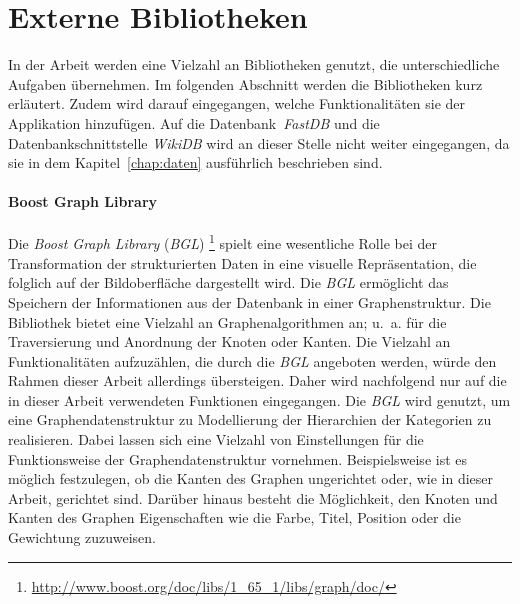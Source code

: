 


\section{Externe Bibliotheken}\label{subchap:external-libs}

In der Arbeit werden eine Vielzahl an Bibliotheken genutzt, die unterschiedliche Aufgaben übernehmen.
Im folgenden Abschnitt werden die Bibliotheken kurz erläutert.
Zudem wird darauf eingegangen, welche Funktionalitäten sie der Applikation hinzufügen.
Auf die Datenbank~\emph{FastDB} und die Datenbankschnittstelle \emph{WikiDB} wird an dieser Stelle nicht weiter eingegangen, da sie in dem Kapitel~\ref{chap:daten} ausführlich beschrieben sind.

\paragraph{Boost Graph Library}
Die \emph{Boost Graph Library} (\emph{BGL}) \footnote{\url{http://www.boost.org/doc/libs/1_65_1/libs/graph/doc/}} spielt eine wesentliche Rolle bei der Transformation der strukturierten Daten in eine visuelle Repräsentation, die folglich auf der Bildoberfläche dargestellt wird.
Die \emph{BGL} ermöglicht das Speichern der Informationen aus der Datenbank in einer Graphenstruktur.
Die Bibliothek bietet eine Vielzahl an Graphenalgorithmen an; u.~a. für die Traversierung und Anordnung der Knoten oder Kanten.
Die Vielzahl an Funktionalitäten aufzuzählen, die durch die \emph{BGL} angeboten werden, würde den Rahmen dieser Arbeit allerdings übersteigen.
Daher wird nachfolgend nur auf die in dieser Arbeit verwendeten Funktionen eingegangen.
Die \emph{BGL} wird genutzt, um eine Graphendatenstruktur zu Modellierung der Hierarchien der Kategorien zu realisieren.
Dabei lassen sich eine Vielzahl von Einstellungen für die Funktionsweise der Graphendatenstruktur vornehmen.
Beispielsweise ist es möglich festzulegen, ob die Kanten des Graphen ungerichtet oder, wie in dieser Arbeit, gerichtet sind.
Darüber hinaus besteht die Möglichkeit, den Knoten und Kanten des Graphen Eigenschaften wie die Farbe, Titel, Position oder die Gewichtung zuzuweisen.

